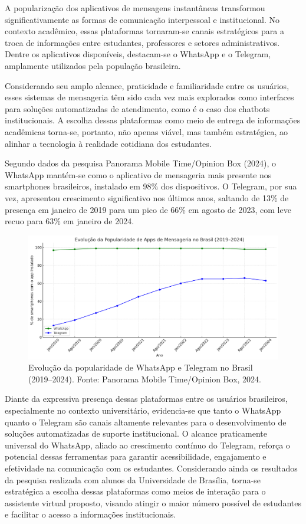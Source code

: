 A popularização dos aplicativos de mensagens instantâneas transformou significativamente as formas de comunicação interpessoal e institucional. No contexto acadêmico, essas plataformas tornaram-se canais estratégicos para a troca de informações entre estudantes, professores e setores administrativos. Dentre os aplicativos disponíveis, destacam-se o WhatsApp e o Telegram, amplamente utilizados pela população brasileira.

Considerando seu amplo alcance, praticidade e familiaridade entre os usuários, esses sistemas de mensageria têm sido cada vez mais explorados como interfaces para soluções automatizadas de atendimento, como é o caso dos chatbots institucionais. A escolha dessas plataformas como meio de entrega de informações acadêmicas torna-se, portanto, não apenas viável, mas também estratégica, ao alinhar a tecnologia à realidade cotidiana dos estudantes.

Segundo dados da pesquisa Panorama Mobile Time/Opinion Box (2024), o WhatsApp mantém-se como o aplicativo de mensageria mais presente nos smartphones brasileiros, instalado em 98\% dos dispositivos. O Telegram, por sua vez, apresentou crescimento significativo nos últimos anos, saltando de 13\% de presença em janeiro de 2019 para um pico de 66\% em agosto de 2023, com leve recuo para 63\% em janeiro de 2024.

\begin{figure}[h]
	\centering
	\label{fig01}
		\includegraphics[keepaspectratio=true,scale=0.3]{figuras/grafico-mensageiros.png}
	\caption{Evolução da popularidade de WhatsApp e Telegram no Brasil (2019–2024). Fonte: Panorama Mobile Time/Opinion Box, 2024.}
\end{figure}

Diante da expressiva presença dessas plataformas entre os usuários brasileiros, especialmente no contexto universitário, evidencia-se que tanto o WhatsApp quanto o Telegram são canais altamente relevantes para o desenvolvimento de soluções automatizadas de suporte institucional. O alcance praticamente universal do WhatsApp, aliado ao crescimento contínuo do Telegram, reforça o potencial dessas ferramentas para garantir acessibilidade, engajamento e efetividade na comunicação com os estudantes. Considerando ainda os resultados da pesquisa realizada com alunos da Universidade de Brasília, torna-se estratégica a escolha dessas plataformas como meios de interação para o assistente virtual proposto, visando atingir o maior número possível de estudantes e facilitar o acesso a informações institucionais.

